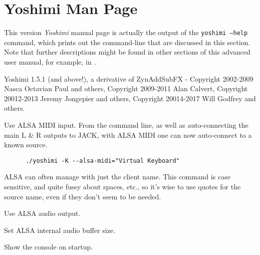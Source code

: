 %
%
%

\section{Yoshimi Man Page}
\label{sec:yoshimi_man_page}

   This version \textsl{Yoshimi} manual page is actually the output of the
   \texttt{yoshimi --help} command, which prints out the command-line that
   are discussed in this section.  Note that further descriptions might be
   found in other sections of this advanced user manual, for example, in
   .

   Yoshimi 1.5.1 (and above!), a derivative of ZynAddSubFX - Copyright
   2002-2009 Nasca Octavian Paul and others, Copyright 2009-2011 Alan Calvert,
   Copyright 20012-2013 Jeremy Jongepier and others,
   Copyright 20014-2017 Will Godfrey and others.

   \setcounter{ItemCounter}{0}      %

      Use ALSA MIDI input.
      From the command line, as well as auto-connecting the main L \& R
      outputs to JACK, with ALSA MIDI one can now auto-connect to a known source.

   \begin{verbatim}
      ./yoshimi -K --alsa-midi="Virtual Keyboard"
   \end{verbatim}

      ALSA can often manage with just the client name.  This command is case
      sensitive, and quite fussy about spaces, etc., so it's wise to use
      quotes for the source name, even if they don't seem to be needed.

      Use ALSA audio output.

      Set ALSA internal audio buffer size.

      Show the console on startup.


